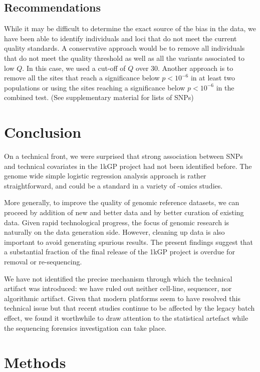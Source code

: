 \documentclass[9pt,lineno]{elife}
\begin{document}
\subsection{Recommendations}
While it may be difficult to determine the exact source of the bias in the data, we have been able to identify individuals and loci that do not meet the current quality standards.
A conservative approach would be to remove all individuals that do not meet the quality threshold as well as all the variants associated to low $Q$.
In this case, we used a cut-off of $Q$ over 30.
Another approach is to remove all the sites that reach a significance below $ p < 10^{-6}$ in at least two populations or using the sites reaching a significance below $ p < 10^{-6}$ in the combined test. (See supplementary material for lists of SNPs)

\section{Conclusion}

On a technical front, we were surprised that strong association between SNPs and technical covariates in the 1kGP project had not been identified before. 
The genome wide simple logistic regression analysis approach is rather straightforward, and could be a standard in a variety of -omics studies. 

More generally, to improve the quality of genomic reference datasets, we can proceed by addition of new and better data and by better curation of existing data.
Given rapid technological progress, the focus of genomic research is naturally on the data generation side. However, cleaning up data is also important to avoid generating spurious results. 
The present findings suggest that a substantial fraction of the final release of the 1kGP project is overdue for removal or re-sequencing. 

We have not identified the precise mechanism through which the technical artifact was introduced: we have ruled out neither cell-line, sequencer, nor algorithmic artifact. 
Given that modern platforms seem to have resolved this technical issue but that recent studies continue to be affected by the legacy batch effect, we found it worthwhile to draw attention to the statistical artefact while the sequencing forensics investigation can take place.     


\section{Methods}
\end{document}
